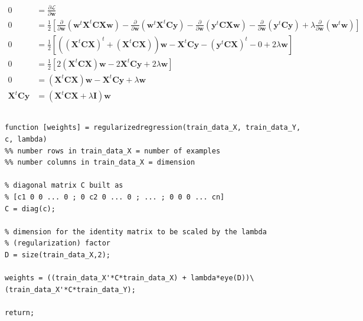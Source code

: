 \documentclass[paper=a4, fontsize=11pt]{scrartcl} %
\numberwithin{equation}{section} %
\numberwithin{figure}{section} %
\numberwithin{table}{section} %
\begin{document}
\begin{equation}
\begin{split}
    0 &= \frac{\partial \mathcal{L}}{\partial \textbf{w}}\\
    0 &= \frac{1}{2}\left[\frac{\partial}{\partial \textbf{w}}\left(\textbf{w}^{t}\textbf{X}^{t}\textbf{C}\textbf{X}\textbf{w}\right) 
        - \frac{\partial}{\partial \textbf{w}}\left(\textbf{w}^{t}\textbf{X}^{t}\textbf{C}\textbf{y}\right) 
        - \frac{\partial}{\partial \textbf{w}}\left(\textbf{y}^{t}\textbf{C}\textbf{X}\textbf{w}\right) 
        - \frac{\partial}{\partial \textbf{w}}\left(\textbf{y}^{t}\textbf{C}\textbf{y}\right) 
        + \lambda\frac{\partial}{\partial \textbf{w}}\left(\textbf{w}^{t}\textbf{w}\right)\right]\\
    0 &= \frac{1}{2}\left[
        \left(\left(\textbf{X}^{t}\textbf{C}\textbf{X}\right)^{t} + \left(\textbf{X}^{t}\textbf{C}\textbf{X}\right)\right)\textbf{w} 
        - \textbf{X}^{t}\textbf{C}\textbf{y} 
        - \left(\textbf{y}^{t}\textbf{C}\textbf{X}\right)^{t} 
        - 0 
        + 2\lambda\textbf{w}\right]\\
    0 &= \frac{1}{2}\left[
        2\left(\textbf{X}^{t}\textbf{C}\textbf{X}\right)\textbf{w} 
        - 2\textbf{X}^{t}\textbf{C}\textbf{y} 
        + 2\lambda\textbf{w}\right]\\
    0 &= \left(\textbf{X}^{t}\textbf{C}\textbf{X}\right)\textbf{w} 
        - \textbf{X}^{t}\textbf{C}\textbf{y} 
        + \lambda\textbf{w}\\
    \textbf{X}^{t}\textbf{C}\textbf{y} &= \left(\textbf{X}^{t}\textbf{C}\textbf{X} + \lambda\textbf{I}\right)\textbf{w} 
    \label{eq:3-2-regular-matrix-normal}
\end{split}
\end{equation}

\subsection{}
\label{subsec:3-3}

\begin{lstlisting}[label=lst:reg-regression,caption={MATLAB function for 
calculating the coefficients of the linear regression on a given training 
dataset, including a regularization factor.}]
function [weights] = regularizedregression(train_data_X, train_data_Y, c, lambda)
%% number rows in train_data_X = number of examples
%% number columns in train_data_X = dimension

% diagonal matrix C built as 
% [c1 0 0 ... 0 ; 0 c2 0 ... 0 ; ... ; 0 0 0 ... cn] 
C = diag(c);

% dimension for the identity matrix to be scaled by the lambda 
% (regularization) factor
D = size(train_data_X,2);

weights = ((train_data_X'*C*train_data_X) + lambda*eye(D))\(train_data_X'*C*train_data_Y);

return;
\end{lstlisting}
\end{document}
